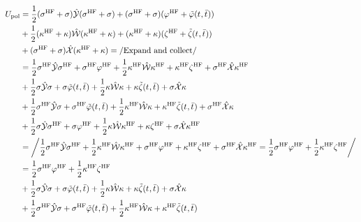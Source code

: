 \begin{equation}
  \begin{aligned}
  U_\mathrm{pol} &=
  \frac{1}{2}(\sigma^\mathrm{HF}+\sigma)\PCM(\sigma^\mathrm{HF}+\sigma)
+ (\sigma^\mathrm{HF}+\sigma)(\esp^\mathrm{HF}+\tilde{\esp}(\tamp{},\tbar{})) \\
&+ \frac{1}{2}(\kappa^\mathrm{HF}+\kappa)\MM(\kappa^\mathrm{HF}+\kappa)
+ (\kappa^\mathrm{HF}+\kappa)(\zeta^\mathrm{HF}+\tilde{\zeta}(\tamp{},\tbar{})) \\
&+ (\sigma^\mathrm{HF}+\sigma)\bi{X}(\kappa^\mathrm{HF}+\kappa)
= \left/ \text{Expand and collect} \right/ \\
&=
    \frac{1}{2}\sigma^\mathrm{HF}\PCM\sigma^\mathrm{HF}
  + \sigma^\mathrm{HF}\esp^\mathrm{HF}
  + \frac{1}{2}\kappa^\mathrm{HF}\MM\kappa^\mathrm{HF}
  + \kappa^\mathrm{HF}\zeta^\mathrm{HF}
  + \sigma^\mathrm{HF}\bi{X}\kappa^\mathrm{HF} \\
&+  \frac{1}{2}\sigma\PCM\sigma
  + \sigma\tilde{\esp}(\tamp{},\tbar{})
  + \frac{1}{2}\kappa\MM\kappa
  + \kappa\tilde{\zeta}(\tamp{},\tbar{})
  + \sigma\bi{X}\kappa \\
&+  \frac{1}{2}\sigma^\mathrm{HF}\PCM\sigma
  + \sigma^\mathrm{HF}\tilde{\esp}(\tamp{},\tbar{})
  + \frac{1}{2}\kappa^\mathrm{HF}\MM\kappa
  + \kappa^\mathrm{HF}\tilde{\zeta}(\tamp{},\tbar{})
  + \sigma^\mathrm{HF}\bi{X}\kappa \\
&+  \frac{1}{2}\sigma\PCM\sigma^\mathrm{HF}
  + \sigma\esp^\mathrm{HF}
  + \frac{1}{2}\kappa\MM\kappa^\mathrm{HF}
  + \kappa\zeta^\mathrm{HF}
  + \sigma\bi{X}\kappa^\mathrm{HF} \\
&= \left/
  \frac{1}{2}\sigma^\mathrm{HF}\PCM\sigma^\mathrm{HF}
  +
  \frac{1}{2}\kappa^\mathrm{HF}\MM\kappa^\mathrm{HF}
  +
  \sigma^\mathrm{HF}\esp^\mathrm{HF}
  +
  \kappa^\mathrm{HF}\zeta^\mathrm{HF}
  +
  \sigma^\mathrm{HF}\bi{X}\kappa^\mathrm{HF}
  =
  \frac{1}{2}\sigma^\mathrm{HF}\esp^\mathrm{HF}
  +
  \frac{1}{2}\kappa^\mathrm{HF}\zeta^\mathrm{HF}
  \right/ \\
&=
    \frac{1}{2}\sigma^\mathrm{HF}\esp^\mathrm{HF}
  + \frac{1}{2}\kappa^\mathrm{HF}\zeta^\mathrm{HF} \\
&+  \frac{1}{2}\sigma\PCM\sigma
  + \sigma\tilde{\esp}(\tamp{},\tbar{})
  + \frac{1}{2}\kappa\MM\kappa
  + \kappa\tilde{\zeta}(\tamp{},\tbar{})
  + \sigma\bi{X}\kappa \\
&+  \frac{1}{2}\sigma^\mathrm{HF}\PCM\sigma
  + \sigma^\mathrm{HF}\tilde{\esp}(\tamp{},\tbar{})
  + \frac{1}{2}\kappa^\mathrm{HF}\MM\kappa
  + \kappa^\mathrm{HF}\tilde{\zeta}(\tamp{},\tbar{})

\end{aligned}
\end{equation}

